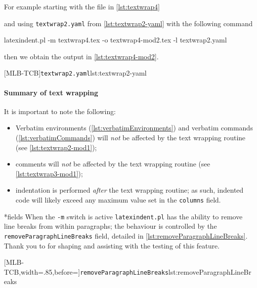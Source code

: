 	For example starting with the file in \cref{lst:textwrap4} 

	 and using \texttt{textwrap2.yaml} from \cref{lst:textwrap2-yaml} with the following command \begin{commandshell}
latexindent.pl -m textwrap4.tex -o textwrap4-mod2.tex -l textwrap2.yaml
\end{commandshell} then we obtain the output in \cref{lst:textwrap4-mod2}.

	\begin{minipage}{.45\linewidth}
	\end{minipage}
	\hfill
	\begin{minipage}{.45\linewidth}
		[MLB-TCB]{\texttt{textwrap2.yaml}}{lst:textwrap2-yaml}
	\end{minipage}

	\paragraph{Summary of text wrapping}
		It is important to note the following: \begin{itemize} \item Verbatim environments (\vref{lst:verbatimEnvironments}) and verbatim commands (\vref{lst:verbatimCommands}) will \emph{not} be affected by the text wrapping routine (see \vref{lst:textwrap2-mod1});
			\item comments will \emph{not} be affected by the text wrapping routine (see \vref{lst:textwrap3-mod1});
			\item indentation is performed \emph{after} the text wrapping routine; as such, indented code will likely exceed any maximum value set in the \texttt{columns} field.
		\end{itemize}

*{fields}
	When the \texttt{-m} switch is active \texttt{latexindent.pl} has the ability to remove line breaks%
	 from within paragraphs; the behaviour is controlled by the \texttt{removeParagraphLineBreaks} field, detailed in \cref{lst:removeParagraphLineBreaks}.
	Thank you to \cite{jowens} for shaping and assisting with the testing of this feature.

	[MLB-TCB,width=.85\linewidth,before=\centering]{\texttt{removeParagraphLineBreaks}}{lst:removeParagraphLineBreaks}

